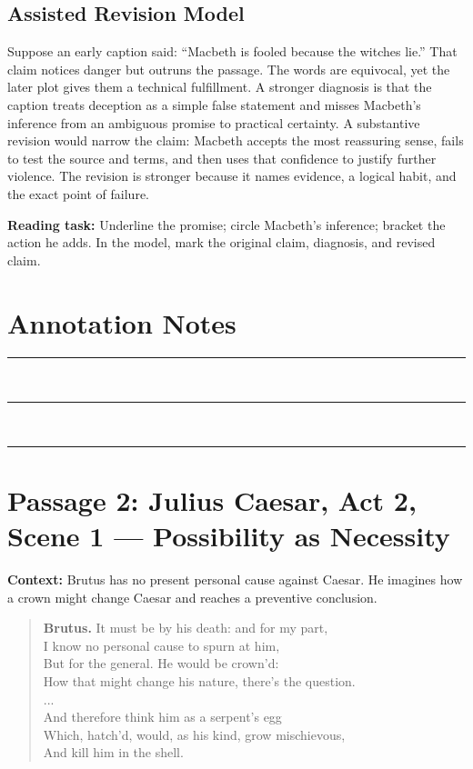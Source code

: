\documentclass[12pt]{article}
\newenvironment{playpassage}{\begin{quote}\footnotesize\setlength{\parskip}{0.08em}\setlength{\parindent}{0pt}}{\end{quote}}
\newcommand{\speaker}[1]{\textbf{#1.}}
\begin{document}
\subsection*{Assisted Revision Model}
Suppose an early caption said: ``Macbeth is fooled because the witches lie.'' That claim notices danger but outruns the passage. The words are equivocal, yet the later plot gives them a technical fulfillment. A stronger diagnosis is that the caption treats deception as a simple false statement and misses Macbeth's inference from an ambiguous promise to practical certainty. A substantive revision would narrow the claim: Macbeth accepts the most reassuring sense, fails to test the source and terms, and then uses that confidence to justify further violence. The revision is stronger because it names evidence, a logical habit, and the exact point of failure.

\textbf{Reading task:} Underline the promise; circle Macbeth's inference; bracket the action he adds. In the model, mark the original claim, diagnosis, and revised claim.

\vfill
\section*{Annotation Notes}
\noindent\rule{\textwidth}{0.4pt}\\[1.0em]
\rule{\textwidth}{0.4pt}\\[1.0em]
\rule{\textwidth}{0.4pt}

\newpage
\section*{Passage 2: Julius Caesar, Act 2, Scene 1 --- Possibility as Necessity}
\textbf{Context:} Brutus has no present personal cause against Caesar. He imagines how a crown might change Caesar and reaches a preventive conclusion.
\begin{playpassage}
\speaker{Brutus} It must be by his death: and for my part,\\
I know no personal cause to spurn at him,\\
But for the general. He would be crown'd:\\
How that might change his nature, there's the question.\\
...\\
And therefore think him as a serpent's egg\\
Which, hatch'd, would, as his kind, grow mischievous,\\
And kill him in the shell.
\end{playpassage}
\end{document}
